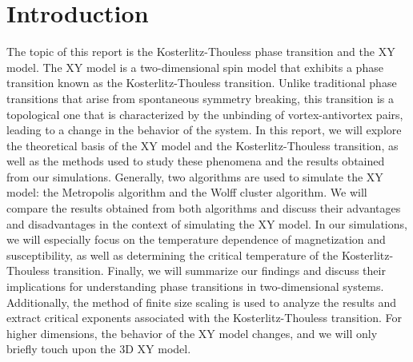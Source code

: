 \section{Introduction}
The topic of this report is the Kosterlitz-Thouless phase transition and the XY model.
The XY model is a two-dimensional spin model that exhibits a phase transition known as the Kosterlitz-Thouless transition.
Unlike traditional phase transitions that arise from spontaneous symmetry breaking, this transition is a topological one that is characterized by the unbinding of vortex-antivortex pairs, leading to a change in the behavior of the system.
In this report, we will explore the theoretical basis of the XY model and the Kosterlitz-Thouless transition, as well as the methods used to study these phenomena and the results obtained from our simulations.
Generally, two algorithms are used to simulate the XY model: the Metropolis algorithm and the Wolff cluster algorithm.
We will compare the results obtained from both algorithms and discuss their advantages and disadvantages in the context of simulating the XY model.
In our simulations, we will especially focus on the temperature dependence of magnetization and susceptibility, as well as determining the critical temperature of the Kosterlitz-Thouless transition.
Finally, we will summarize our findings and discuss their implications for understanding phase transitions in two-dimensional systems.
Additionally, the method of finite size scaling is used to analyze the results and extract critical exponents associated with the Kosterlitz-Thouless transition.
For higher dimensions, the behavior of the XY model changes, and we will only briefly touch upon the 3D XY model.